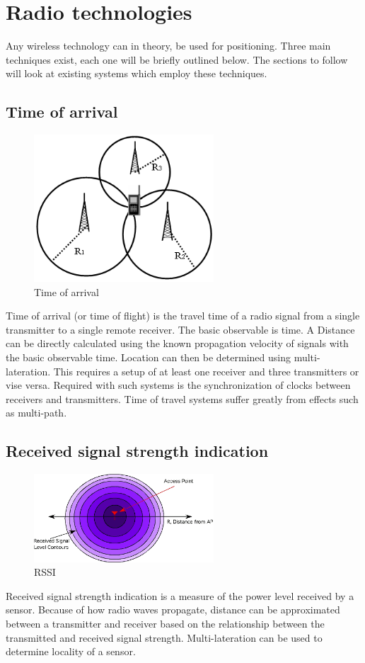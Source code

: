 \documentclass[11pt,a4paper]{report}
\begin{document}
	\section{Radio technologies}
		Any wireless technology can in theory, be used for positioning. Three main techniques exist, each one will be briefly outlined below. The sections to follow will look at existing systems which employ these techniques.
	
	\subsection{Time of arrival}
		\begin{figure}[h!]
			\centering
			\includegraphics[width=0.6\textwidth]{time_of_arrival}
			\caption{Time of arrival}
		\end{figure}
		Time of arrival (or time of flight) is the travel time of a radio signal from a single transmitter to a single remote receiver. The basic observable is time. A Distance can be directly calculated using the known propagation velocity of signals with the basic observable time. Location can then be determined using multi-lateration. This requires a setup of at least one receiver and three transmitters or vise versa.
		Required with such systems is the synchronization of clocks between receivers and transmitters.
		Time of travel systems suffer greatly from effects such as multi-path.
		\cite{k._pahlavan_wideband_1998}
	
	\subsection{Received signal strength indication}
		\begin{figure}[h!]
			\centering
			\includegraphics[width=0.6\textwidth]{rssi}
			\caption{RSSI}
		\end{figure}
		Received signal strength indication is a measure of the power level received by a sensor. Because of how radio waves propagate, distance can be approximated between a transmitter and receiver based on the relationship between the transmitted and received signal strength. Multi-lateration can be used to determine locality of a sensor.
	
\end{document}

